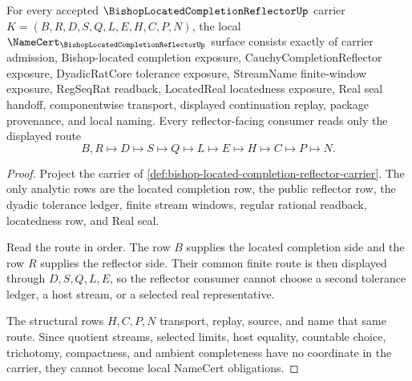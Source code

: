 \begin{theorem}
\label{thm:bishop-located-completion-reflector-namecert-obligations}
For every accepted $\BishopLocatedCompletionReflectorUp$ carrier $K=(B,R,D,S,Q,L,E,H,C,P,N)$, the local $\NameCert_{\BishopLocatedCompletionReflectorUp}$ surface consists exactly of carrier admission, Bishop-located completion exposure, CauchyCompletionReflector exposure, DyadicRatCore tolerance exposure, StreamName finite-window exposure, RegSeqRat readback, LocatedReal locatedness exposure, Real seal handoff, componentwise transport, displayed continuation replay, package provenance, and local naming. Every reflector-facing consumer reads only the displayed route
$$
B,R\longmapsto D\longmapsto S\longmapsto Q\longmapsto L\longmapsto E\longmapsto H\longmapsto C\longmapsto P\longmapsto N .
$$
\end{theorem}
\begin{proof}
Project the carrier of \autoref{def:bishop-located-completion-reflector-carrier}. The only analytic rows are the located completion row, the public reflector row, the dyadic tolerance ledger, finite stream windows, regular rational readback, locatedness row, and Real seal.

Read the route in order. The row $B$ supplies the located completion side and the row $R$ supplies the reflector side. Their common finite route is then displayed through $D,S,Q,L,E$, so the reflector consumer cannot choose a second tolerance ledger, a host stream, or a selected real representative.

The structural rows $H,C,P,N$ transport, replay, source, and name that same route. Since quotient streams, selected limits, host equality, countable choice, trichotomy, compactness, and ambient completeness have no coordinate in the carrier, they cannot become local NameCert obligations.
\end{proof}

